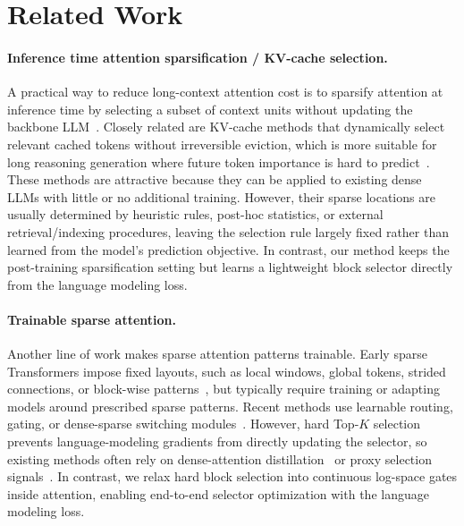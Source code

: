\section{Related Work}
\label{sec:related}

\paragraph{Inference time attention sparsification / KV-cache selection.}
A practical way to reduce long-context attention cost is to sparsify attention at inference time by selecting a subset of context units without updating the backbone LLM~\citep{xiao2023streamingllm, h2o, tang2024quest, jiang2024minference, lserve, liu2024retrievalattention, zhang2025spargeattn, xu2025xattention}.
Closely related are KV-cache methods that dynamically select relevant cached tokens without irreversible eviction, which is more suitable for long reasoning generation where future token importance is hard to predict~\citep{tang2024quest, pqcache, squeezedattention, liu2024retrievalattention, cai2026rkvredundancyawarekvcache, hao2025omnikv, metaclusterkv}.
These methods are attractive because they can be applied to existing dense LLMs with little or no additional training.
However, their sparse locations are usually determined by heuristic rules, post-hoc statistics, or external retrieval/indexing procedures, leaving the selection rule largely fixed rather than learned from the model's prediction objective. In contrast, our method keeps the post-training sparsification setting but learns a lightweight block selector directly from the language modeling loss.

\paragraph{Trainable sparse attention.}
Another line of work makes sparse attention patterns trainable.
Early sparse Transformers impose fixed layouts, such as local windows, global tokens, strided connections, or block-wise patterns~\citep{child2019generating, beltagy2020longformer, zaheer2020big}, but typically require training or adapting models around prescribed sparse patterns.
Recent methods use learnable routing, gating, or dense-sparse switching modules~\citep{zhu2023biformer, yuan2025native, lumoba, team2025minicpm4, gao2024seerattention, gao2025seerattention, zhao2025infllm, liu2025deepseek}.
However, hard Top-$K$ selection prevents language-modeling gradients from directly updating the selector, so existing methods often rely on dense-attention distillation~\citep{gao2024seerattention, gao2025seerattention, liu2025deepseek} or proxy selection signals~\citep{yuan2025native, lumoba}.
In contrast, we relax hard block selection into continuous log-space gates inside attention, enabling end-to-end selector optimization with the language modeling loss.
